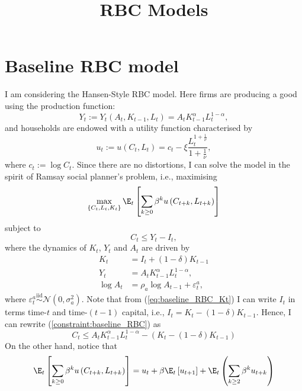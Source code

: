 \documentclass{article}
\title{RBC Models}
\begin{document}
	\maketitle

	\section{Baseline RBC model}
    I am  considering the Hansen-Style RBC model. Here firms are producing a good using the production function:
	\begin{equation}\label{eq:baseline_RBC_Yt}
	Y_t := Y_t(A_t, K_{t-1}, L_t) = A_t  K_{t-1}^\alpha L_t^{1-\alpha},
	\end{equation}
	and households are endowed with a utility function characterised by
	\begin{equation}
		u_t :=u\left(C_t, L_t\right) = c_t - \xi \frac{L_t^{1+\frac{1}{\nu}}}{1+\frac{1}{\nu}},
	\end{equation}
	where $c_t:= \log C_t$. Since there are no distortions, I can solve the model in the spirit of Ramsay social planner's problem, i.e., maximising
	\begin{equation}
		\max_{\{C_t, L_t, K_t\}} \E_t\left[\sum_{k\geq 0}\beta^ku\left(C_{t+k}, L_{t+k}\right)\right]
	\end{equation}
	subject to
	\begin{equation}
		C_t \leq Y_t - I_t, \label{constraint:baseline_RBC}
	\end{equation}
	where the dynamics of $K_t$, $Y_t$ and $A_t$ are driven by
	\begin{align}
			K_t &= I_t + (1-\delta) K_{t-1} \label{eq:baseline_RBC_Kt}\\
			Y_t & = 	 A_t K_{t-1}^\alpha L_t^{1-\alpha}, \label{eq:baseline_RBC_Yt_2}\\
			\log A_t & = \rho_a \log A_{t-1} + \varepsilon_t^a, \label{eq:baseline_RBC_At}
		\end{align}
	where $\varepsilon_t^a\overset{\text{iid}}{\sim}\mathcal{N}\left(0,\sigma_a^2\right)$. Note that from (\ref{eq:baseline_RBC_Kt}) I can write $I_t$ in terms time-$t$ and time-$(t-1)$ capital, i.e., $I_t = K_t - (1-\delta)K_{t-1}$. Hence, I can rewrite (\ref{constraint:baseline_RBC}) as
	\begin{equation}\label{constraint:baseline_RBC_single_one}
		C_t \leq A_t K_{t-1}^\alpha L_t^{1-\alpha} - \left(K_t - (1-\delta) K_{t-1}\right)
	\end{equation}
	On the other hand, notice that
	$$
		\E_t\left[\sum_{k\geq 0}\beta^ku\left(C_{t+k}, L_{t+k}\right)\right] = u_t + \beta\E_t\left[u_{t+1}\right] + \E_t\left(\sum_{k\geq 2}\beta^k u_{t+k}\right)
	$$
\end{document}
